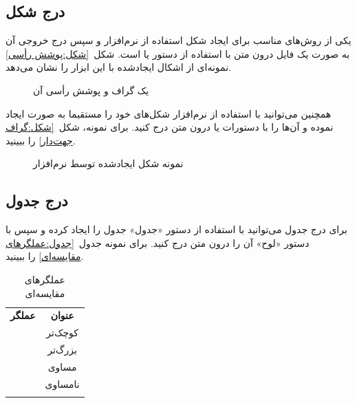 \subsection{درج شکل}

یکی از روش‌های مناسب برای ایجاد شکل استفاده از نرم‌افزار  و سپس
درج خروجی آن به صورت یک فایل  درون متن 
با استفاده از دستور   یا  است.
شکل~\ref{شکل:پوشش رأسی} نمونه‌ای از اشکال ایجادشده با این ابزار را نشان می‌دهد.


\begin{figure}[ht]
\caption{یک گراف و پوشش رأسی آن}
\end{figure}

\bigskip
همچنین می‌توانید با استفاده از نرم‌افزار  شکل‌های خود را مستقیما
به صورت  ایجاد نموده و آن‌ها را با دستورات  یا   
درون متن درج کنید. برای نمونه، شکل~\ref{شکل:گراف جهت‌دار} را ببینید.


\begin{figure}[ht]
\caption{نمونه شکل ایجادشده توسط نرم‌افزار }
\end{figure}


\subsection{درج جدول}

برای درج جدول می‌توانید با استفاده از دستور  «جدول»
جدول را ایجاد کرده و سپس با دستور  «لوح»  آن را درون متن درج کنید.
برای نمونه جدول~\ref{جدول:عملگرهای مقایسه‌ای} را ببینید.

\vspace{1.5em}

\begin{table}[ht]
\centering
\caption{عملگرهای مقایسه‌ای}

\begin{tabular}{|c|c|}
\hfill 
\bfseries عملگر & \bfseries عنوان \\ 
\hfill \hfill 
{}{<} & کوچک‌تر \\ 
{>} & بزرگ‌تر \\
{==} &  مساوی \\ 
{<>} & نامساوی \\ 
\hfill
\end{tabular}

\end{table}



